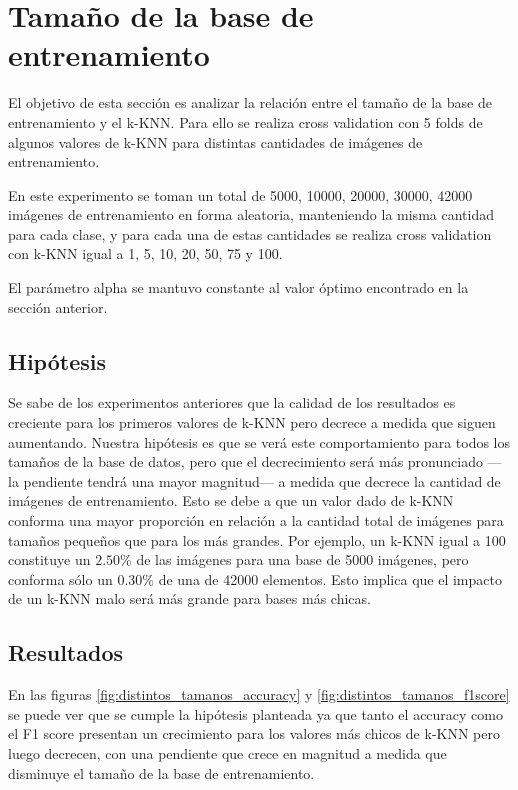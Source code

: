 \section{Tamaño de la base de entrenamiento}

El objetivo de esta sección es analizar la relación entre el tamaño de la base de entrenamiento y el k-KNN. Para ello se realiza cross validation con 5 folds de algunos valores de k-KNN para distintas cantidades de imágenes de entrenamiento.

En este experimento se toman un total de 5000, 10000, 20000, 30000, 42000 imágenes de entrenamiento en forma aleatoria, manteniendo la misma cantidad para cada clase, y para cada una de estas cantidades se realiza cross validation con k-KNN igual a 1, 5, 10, 20, 50, 75 y 100.

El parámetro alpha se mantuvo constante al valor óptimo encontrado en la sección anterior.

\subsection{Hipótesis}

Se sabe de los experimentos anteriores que la calidad de los resultados es creciente para los primeros valores de k-KNN pero decrece a medida que siguen aumentando. Nuestra hipótesis es que se verá este comportamiento para todos los tamaños de la base de datos, pero que el decrecimiento será más pronunciado ---la pendiente tendrá una mayor magnitud--- a medida que decrece la cantidad de imágenes de entrenamiento. Esto se debe a que un valor dado de k-KNN conforma una mayor proporción en relación a la cantidad total de imágenes para tamaños pequeños que para los más grandes. Por ejemplo, un k-KNN igual a 100 constituye un $2.50\%$ de las imágenes para una base de 5000 imágenes, pero conforma sólo un $0.30\%$ de una de 42000 elementos. Esto implica que el impacto de un k-KNN malo será más grande para bases más chicas.

\subsection{Resultados}

En las figuras \ref{fig:distintos_tamanos_accuracy} y \ref{fig:distintos_tamanos_f1score} se puede ver que se cumple la hipótesis planteada ya que tanto el accuracy como el F1 score presentan un crecimiento para los valores más chicos de k-KNN pero luego decrecen, con una pendiente que crece en magnitud a medida que disminuye el tamaño de la base de entrenamiento.

